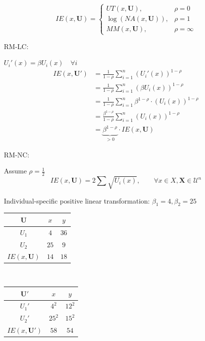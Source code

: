\documentclass[a4paper]{article}
\begin{document}
\begin{equation*}
    IE(x,\mathbf{U})=
    \begin{cases}
        UT(x,\mathbf{U}), & \rho=0 \\
        \log \left(NA(x,\mathbf{U})\right), & \rho=1 \\
        MM(x,\mathbf{U}), & \rho=\infty
    \end{cases}
\end{equation*}

RM-LC:

$U_i'(x)=\beta U_i(x)\quad\forall i$
\begin{align*}
    IE(x, \mathbf{U}') &= \frac{1}{1-\rho}\sum_{i=1}^{n}(U_i'(x))^{1-\rho} \\
    &= \frac{1}{1-\rho}\sum_{i=1}^{n}(\beta U_i(x))^{1-\rho}      \\
    &= \frac{1}{1-\rho}\sum_{i=1}^{n}\beta^{1-\rho}\cdot (U_i(x))^{1-\rho} \\
    &= \frac{\beta^{1-\rho}}{1-\rho}\sum_{i=1}^{n}(U_i(x))^{1-\rho} \\
    &= \underbrace{\beta^{1-\rho}}_{>0}\cdot IE(x,\mathbf{U})
\end{align*}

RM-NC:

Assume $\rho=\frac{1}{2}$
\[IE(x,\mathbf{U})=2\sum\sqrt{U_i(x)},\qquad\forall x\in X,\mathbf{X}\in\mathscr{U}^{n} \]

Individual-specific positive linear transformation: $\beta_1=4,\beta_2=25$
\begin{table}[!htbp]
    \centering
    \begin{tabular}{c|cc|}
        $\mathbf{U}$ & $x$ & $y$              \\ 
        \hline
        $U_1$        & $4$ & $36$ \\
        $U_2$        & $25$ & $9$ \\
        \hline
        $IE(x,\mathbf{U})$ & $14$ & $18$ \\
    \end{tabular}
    $\qquad\qquad$
    \begin{tabular}{c|cc|}
        $\mathbf{U'}$ & $x$ & $y$              \\ 
        \hline
        $U_1'$        & $4^2$ & $12^2$ \\
        $U_2'$        & $25^2$ & $15^2$ \\
        \hline
        $IE(x,\mathbf{U}')$ & $58$ & $54$ \\
    \end{tabular}
\end{table}
\end{document}

